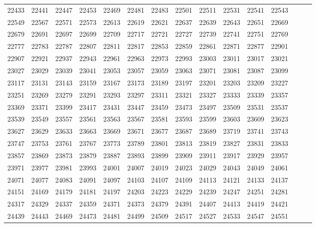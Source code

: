 \documentclass[10pt, a4paper]{article}
\begin{document}
\begin{center}
\begin{longtable}{c c c c c c c c c c c c c c c}
        22433 & 22441 & 22447 & 22453 & 22469 & 22481 & 22483 & 22501 & 22511 & 22531 & 22541 & 22543 \\
        22549 & 22567 & 22571 & 22573 & 22613 & 22619 & 22621 & 22637 & 22639 & 22643 & 22651 & 22669 \\
        22679 & 22691 & 22697 & 22699 & 22709 & 22717 & 22721 & 22727 & 22739 & 22741 & 22751 & 22769 \\
        22777 & 22783 & 22787 & 22807 & 22811 & 22817 & 22853 & 22859 & 22861 & 22871 & 22877 & 22901 \\
        22907 & 22921 & 22937 & 22943 & 22961 & 22963 & 22973 & 22993 & 23003 & 23011 & 23017 & 23021 \\
        23027 & 23029 & 23039 & 23041 & 23053 & 23057 & 23059 & 23063 & 23071 & 23081 & 23087 & 23099 \\
        23117 & 23131 & 23143 & 23159 & 23167 & 23173 & 23189 & 23197 & 23201 & 23203 & 23209 & 23227 \\
        23251 & 23269 & 23279 & 23291 & 23293 & 23297 & 23311 & 23321 & 23327 & 23333 & 23339 & 23357 \\
        23369 & 23371 & 23399 & 23417 & 23431 & 23447 & 23459 & 23473 & 23497 & 23509 & 23531 & 23537 \\
        23539 & 23549 & 23557 & 23561 & 23563 & 23567 & 23581 & 23593 & 23599 & 23603 & 23609 & 23623 \\
        23627 & 23629 & 23633 & 23663 & 23669 & 23671 & 23677 & 23687 & 23689 & 23719 & 23741 & 23743 \\
        23747 & 23753 & 23761 & 23767 & 23773 & 23789 & 23801 & 23813 & 23819 & 23827 & 23831 & 23833 \\
        23857 & 23869 & 23873 & 23879 & 23887 & 23893 & 23899 & 23909 & 23911 & 23917 & 23929 & 23957 \\
        23971 & 23977 & 23981 & 23993 & 24001 & 24007 & 24019 & 24023 & 24029 & 24043 & 24049 & 24061 \\
        24071 & 24077 & 24083 & 24091 & 24097 & 24103 & 24107 & 24109 & 24113 & 24121 & 24133 & 24137 \\
        24151 & 24169 & 24179 & 24181 & 24197 & 24203 & 24223 & 24229 & 24239 & 24247 & 24251 & 24281 \\
        24317 & 24329 & 24337 & 24359 & 24371 & 24373 & 24379 & 24391 & 24407 & 24413 & 24419 & 24421 \\
        24439 & 24443 & 24469 & 24473 & 24481 & 24499 & 24509 & 24517 & 24527 & 24533 & 24547 & 24551 \\

\end{longtable}
\end{center}
\end{document}
